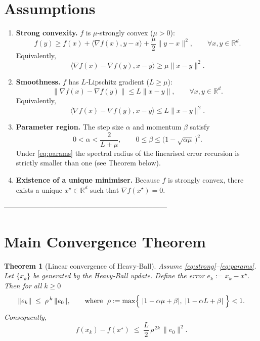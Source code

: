 \documentclass[11pt]{article}
\newtheorem{theorem}{Theorem}
\newcommand{\grad}{\nabla}
\newcommand{\R}{\mathbb{R}}
\begin{document}
\section*{Assumptions}
\begin{enumerate}
\item \textbf{Strong convexity.} $f$ is $\mu$‑strongly convex ($\mu>0$):
\begin{equation}
f(y)\ge f(x)+\langle\grad f(x),y-x\rangle+\frac{\mu}{2}\|y-x\|^2,\qquad\forall x,y\in\R^d .
\label{eq:strong}
\end{equation}
Equivalently,
\begin{equation}
\langle\grad f(x)-\grad f(y),x-y\rangle\ge \mu\|x-y\|^2 .
\label{eq:strong-grad}
\end{equation}

\item \textbf{Smoothness.} $f$ has $L$‑Lipschitz gradient ($L\ge\mu$):
\begin{equation}
\|\grad f(x)-\grad f(y)\|\le L\|x-y\|,\qquad\forall x,y\in\R^d .
\label{eq:smooth}
\end{equation}
Equivalently,
\begin{equation}
\langle\grad f(x)-\grad f(y),x-y\rangle\le L\|x-y\|^2 .
\label{eq:smooth-grad}
\end{equation}

\item \textbf{Parameter region.} The step size $\alpha$ and momentum $\beta$ satisfy
\begin{equation}
0<\alpha<\frac{2}{L+\mu},\qquad
0\le\beta\le\bigl(1-\sqrt{\alpha\mu}\,\bigr)^2 .
\label{eq:params}
\end{equation}
Under \eqref{eq:params} the spectral radius of the linearised error recursion is strictly smaller than one (see Theorem below).

\item \textbf{Existence of a unique minimiser.} Because $f$ is strongly convex, there exists a unique $x^\star\in\R^d$ such that $\grad f(x^\star)=0$.
\end{enumerate}

---------------------------------------------------------------------

\section*{Main Convergence Theorem}
\begin{theorem}[Linear convergence of Heavy‑Ball]\label{thm:linear}
Assume \ref{eq:strong}–\ref{eq:params}.  Let $\{x_k\}$ be generated by the Heavy‑Ball update.  Define the error $e_k:=x_k-x^\star$.  Then for all $k\ge 0$
\begin{equation}
\|e_k\|\;\le\;\rho^{\,k}\,\|e_0\| ,
\qquad\text{where }\;
\rho:=\max\Bigl\{\;|1-\alpha\mu+\beta|,\;|1-\alpha L+\beta|\;\Bigr\}<1 .
\label{eq:linear-rate}
\end{equation}
Consequently,
\[
f(x_k)-f(x^\star)\;\le\;\frac{L}{2}\,\rho^{\,2k}\,\|e_0\|^2 .
\]
\end{theorem}
\end{document}

